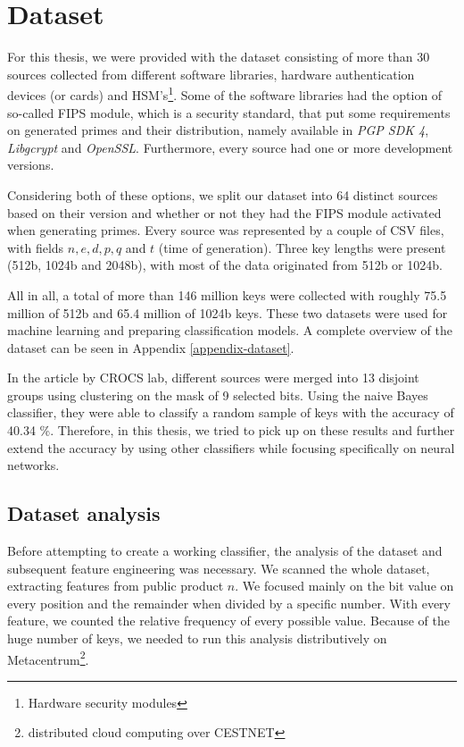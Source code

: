 \chapter{Dataset}
\label{chapter-dataset}

For this thesis, we were provided with the dataset consisting of more than 30 sources collected from different software libraries, hardware authentication devices (or cards) and HSM's\footnote{Hardware security modules}. 
Some of the software libraries had the option of so-called FIPS module, which is a security standard, that put some requirements on generated primes and their distribution, namely available in \textit{PGP SDK 4}, \textit{Libgcrypt} and \textit{OpenSSL}. Furthermore, every source had one or more development versions. 

Considering both of these options, we split our dataset into 64 distinct sources based on their version and whether or not they had the FIPS module activated when generating primes. Every source was represented by a couple of CSV files, with fields $n, e, d, p, q$ and $t$ (time of generation). Three key lengths were present (512b, 1024b and 2048b), with most of the data originated from 512b or 1024b.

All in all, a total of more than 146 million keys were collected with roughly 75.5 million of 512b and 65.4 million of 1024b keys. These two datasets were used for machine learning and preparing classification models. A complete overview of the dataset can be seen in Appendix \ref{appendix-dataset}.

In the article by CROCS lab\cite{svenda_1}, different sources were merged into 13 disjoint groups using clustering on the mask of 9 selected bits. Using the naive Bayes classifier, they were able to classify a random sample of keys with the accuracy of 40.34 \%. Therefore, in this thesis, we tried to pick up on these results and further extend the accuracy by using other classifiers while focusing specifically on neural networks.

\section{Dataset analysis}

\label{chapter-analysis}

Before attempting to create a working classifier, the analysis of the dataset and subsequent feature engineering was necessary. We scanned the whole dataset, extracting features from public product $n$. We focused mainly on the bit value on every position and the remainder when divided by a specific number. With every feature, we counted the relative frequency of every possible value. Because of the huge number of keys, we needed to run this analysis distributively on Metacentrum\footnote{distributed cloud computing over CESTNET}.

